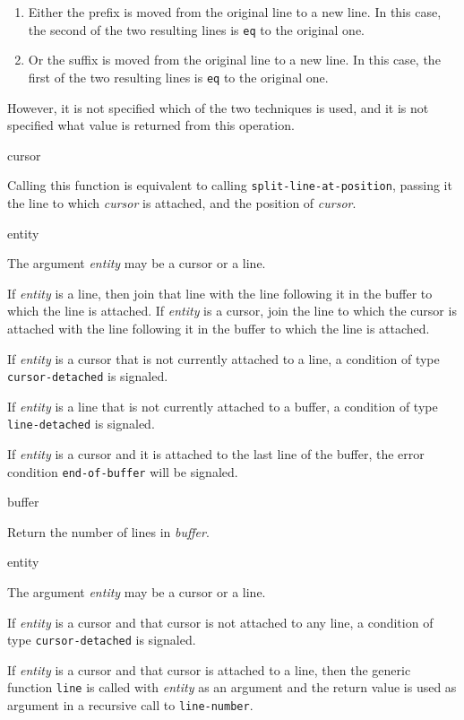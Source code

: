 \begin{enumerate}
\item Either the prefix is moved from the original line to a new line.
  In this case, the second of the two resulting lines is \texttt{eq}
  to the original one.
\item Or the suffix is moved from the original line to a new line.
  In this case, the first of the two resulting lines is \texttt{eq} to
  the original one.
\end{enumerate}

However, it is not specified which of the two techniques is used, and
it is not specified what value is returned from this operation.

 {cursor}

Calling this function is equivalent to calling
\texttt{split-line-at-position}, passing it the line to which
\textit{cursor} is attached, and the position of \textit{cursor}.

\ifdetached{}

 {entity}

The argument \textit{entity} may be a cursor or a line.

If \textit{entity} is a line, then join that line with the line
following it in the buffer to which the line is attached.  If
\textit{entity} is a cursor, join the line to which the cursor is
attached with the line following it in the buffer to which the line is
attached.

If \textit{entity} is a cursor that is not currently attached to a
line, a condition of type \texttt{cursor-detached} is signaled.

If \textit{entity} is a line that is not currently attached to a
buffer, a condition of type \texttt{line-detached} is signaled.

If \textit{entity} is a cursor and it is attached to the last line of
the buffer, the error condition \texttt{end-of-buffer} will be
signaled.

 {buffer}

Return the number of lines in \textit{buffer}.

 {entity}

The argument \textit{entity} may be a cursor or a line.

If \textit{entity} is a cursor and that cursor is not attached to any
line, a condition of type \texttt{cursor-detached} is signaled.

If \textit{entity} is a cursor and that cursor is attached to a line,
then the generic function \texttt{line}  is
called with \textit{entity} as an argument and the return value is
used as argument in a recursive call to \texttt{line-number}.

